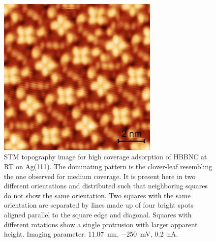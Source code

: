 \begin{figure}[] \centering
	\includegraphics[width=0.7\textwidth]{./images/A180515-095412}
	\caption{STM topography image for high coverage adsorption of HBBNC at RT on Ag(111). The dominating pattern is the clover-leaf resembling the one observed for medium coverage. It is present here in two different orientations and distributed such that neighboring squares do not show the same orientation. Two squares with the same orientation are separated by lines made up of four bright spots aligned parallel to the square edge and diagonal. Squares with different rotations show a single protrusion with larger apparent height. Imaging parameter: \SI{11.07}{\nano \meter}, \SI{-250}{\milli \volt}, \SI{0.2}{\nano \ampere}.}
	\label{fig:HBBNC-high-coverage}
\end{figure}


